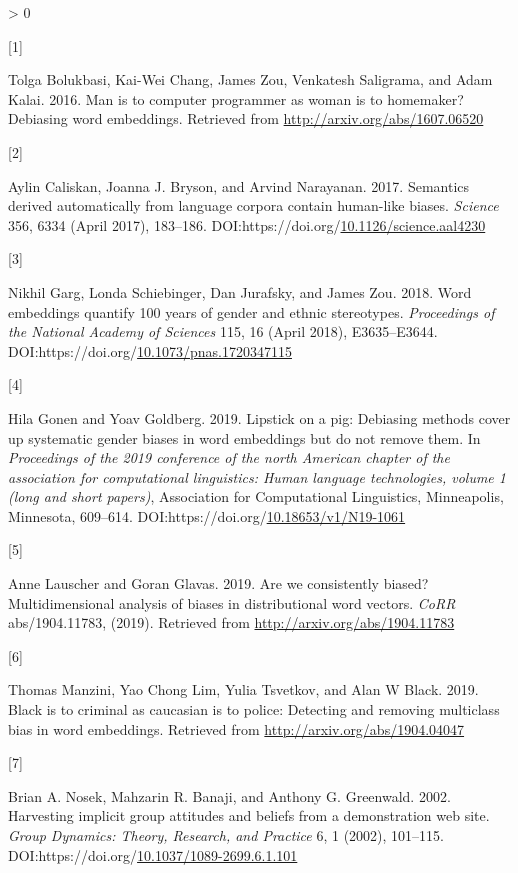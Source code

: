 \documentclass[
  12pt,
  dvipsnames,enabledeprecatedfontcommands]{scrartcl}
\newlength{\cslhangindent}
\newlength{\csllabelwidth}
\newenvironment{CSLReferences}[2] %
 {%
  \setlength{\parindent}{0pt}
  \ifodd #1 \everypar{\setlength{\hangindent}{\cslhangindent}}\ignorespaces\fi
  \ifnum #2 > 0
  \setlength{\parskip}{#2\baselineskip}
  \fi
 }%
 {}
\newcommand{\CSLLeftMargin}[1]{\parbox[t]{\csllabelwidth}{#1}}
\newcommand{\CSLRightInline}[1]{\parbox[t]{\linewidth - \csllabelwidth}{#1}\break}
\begin{document}
\hypertarget{refs}{}
\begin{CSLReferences}{0}{0}
\leavevmode\hypertarget{ref-bolukbasi2016man}{}%
\CSLLeftMargin{{[}1{]} }
\CSLRightInline{Tolga Bolukbasi, Kai-Wei Chang, James Zou, Venkatesh
Saligrama, and Adam Kalai. 2016. Man is to computer programmer as woman
is to homemaker? Debiasing word embeddings. Retrieved from
\url{http://arxiv.org/abs/1607.06520}}

\leavevmode\hypertarget{ref-Caliskan2017semanticsBiases}{}%
\CSLLeftMargin{{[}2{]} }
\CSLRightInline{Aylin Caliskan, Joanna J. Bryson, and Arvind Narayanan.
2017. Semantics derived automatically from language corpora contain
human-like biases. \emph{Science} 356, 6334 (April 2017), 183--186.
DOI:https://doi.org/\href{https://doi.org/10.1126/science.aal4230}{10.1126/science.aal4230}}

\leavevmode\hypertarget{ref-Garg2018years}{}%
\CSLLeftMargin{{[}3{]} }
\CSLRightInline{Nikhil Garg, Londa Schiebinger, Dan Jurafsky, and James
Zou. 2018. Word embeddings quantify 100 years of gender and ethnic
stereotypes. \emph{Proceedings of the National Academy of Sciences} 115,
16 (April 2018), E3635--E3644.
DOI:https://doi.org/\href{https://doi.org/10.1073/pnas.1720347115}{10.1073/pnas.1720347115}}

\leavevmode\hypertarget{ref-Gonen2019lipstick}{}%
\CSLLeftMargin{{[}4{]} }
\CSLRightInline{Hila Gonen and Yoav Goldberg. 2019. Lipstick on a pig:
{D}ebiasing methods cover up systematic gender biases in word embeddings
but do not remove them. In \emph{Proceedings of the 2019 conference of
the north {A}merican chapter of the association for computational
linguistics: Human language technologies, volume 1 (long and short
papers)}, Association for Computational Linguistics, Minneapolis,
Minnesota, 609--614.
DOI:https://doi.org/\href{https://doi.org/10.18653/v1/N19-1061}{10.18653/v1/N19-1061}}

\leavevmode\hypertarget{ref-Lauscher2019multidimensional}{}%
\CSLLeftMargin{{[}5{]} }
\CSLRightInline{Anne Lauscher and Goran Glavas. 2019. Are we
consistently biased? Multidimensional analysis of biases in
distributional word vectors. \emph{CoRR} abs/1904.11783, (2019).
Retrieved from \url{http://arxiv.org/abs/1904.11783}}

\leavevmode\hypertarget{ref-Manzini2019blackToCriminal}{}%
\CSLLeftMargin{{[}6{]} }
\CSLRightInline{Thomas Manzini, Yao Chong Lim, Yulia Tsvetkov, and Alan
W Black. 2019. Black is to criminal as caucasian is to police: Detecting
and removing multiclass bias in word embeddings. Retrieved from
\url{http://arxiv.org/abs/1904.04047}}

\leavevmode\hypertarget{ref-Nosek2002harvesting}{}%
\CSLLeftMargin{{[}7{]} }
\CSLRightInline{Brian A. Nosek, Mahzarin R. Banaji, and Anthony G.
Greenwald. 2002. Harvesting implicit group attitudes and beliefs from a
demonstration web site. \emph{Group Dynamics: Theory, Research, and
Practice} 6, 1 (2002), 101--115.
DOI:https://doi.org/\href{https://doi.org/10.1037/1089-2699.6.1.101}{10.1037/1089-2699.6.1.101}}

\end{CSLReferences}
\end{document}
